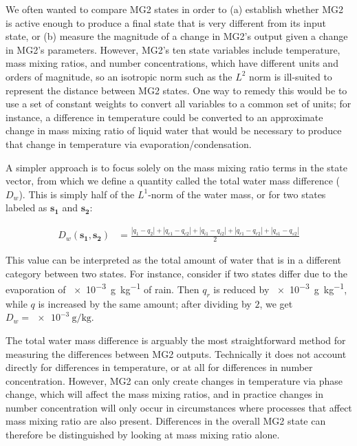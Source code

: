 \documentclass [11pt, proquest] {uwthesis}[2020/02/24]
\begin{document}
We often wanted to compare MG2 states in order to (a) establish whether MG2 is active enough to produce a final state that is very different from its input state, or (b) measure the magnitude of a change in MG2's output given a change in MG2's parameters. However, MG2's ten state variables include temperature, mass mixing ratios, and number concentrations, which have different units and orders of magnitude, so an isotropic norm such as the $L^2$ norm is ill-suited to represent the distance between MG2 states. One way to remedy this would be to use a set of constant weights to convert all variables to a common set of units; for instance, a difference in temperature could be converted to an approximate change in mass mixing ratio of liquid water that would be necessary to produce that change in temperature via evaporation/condensation.

A simpler approach is to focus solely on the mass mixing ratio terms in the state vector, from which we define a quantity called the total water mass difference ($D_w$). This is simply half of the $L^1$-norm of the water mass, or for two states labeled as $\mathbf{s_1}$ and $\mathbf{s_2}$:

\begin{eqnarray}
  D_w(\mathbf{s_1}, \mathbf{s_2}) &= \frac{\left|q_1 - q_2\right| + \left|q_{c1} - q_{c2}\right| + \left|q_{i1} - q_{i2}\right| +
    \left|q_{r1} - q_{r2}\right| + \left|q_{s1} - q_{s2}\right|}{2}
\end{eqnarray}

This value can be interpreted as the total amount of water that is in a different category between two states. For instance, consider if two states differ due to the evaporation of \SI{e-3}{\gram\per\kilo\gram} of rain. Then $q_r$ is reduced by \SI{e-3}{\gram\per\kilo\gram}, while $q$ is increased by the same amount; after dividing by $2$, we get $D_w = \SI{e-3}{\gram\per\kilo\gram}$.

The total water mass difference is arguably the most straightforward method for measuring the differences between MG2 outputs. Technically it does not account directly for differences in temperature, or at all for differences in number concentration. However, MG2 can only create changes in temperature via phase change, which will affect the mass mixing ratios, and in practice changes in number concentration will only occur in circumstances where processes that affect mass mixing ratio are also present. Differences in the overall MG2 state can therefore be distinguished by looking at mass mixing ratio alone.
\end{document}
